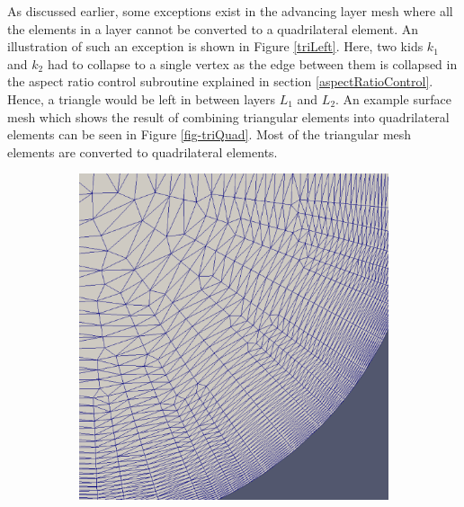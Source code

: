As discussed earlier, some exceptions exist in the advancing layer mesh where all the elements in a layer cannot be converted to a quadrilateral element. An illustration of such an exception is shown in Figure \ref{triLeft}. Here, two kids $k_1$ and $k_2$ had to collapse to a single vertex as the edge between them is collapsed in the aspect ratio control subroutine explained in section \ref{aspectRatioControl}. Hence, a triangle would be left in between layers $L_1$ and $L_2$. An example surface mesh which shows the result of combining triangular elements into quadrilateral elements can be seen in Figure \ref{fig-triQuad}. Most of the triangular mesh elements are converted to quadrilateral elements.

\begin{figure}
\centering
\begin{subfigure}{0.5\textwidth}
\includegraphics[width=0.9\linewidth]{img/m2/combine-tris-to-quads/combineTrisToQuads1.eps}
\caption{}
\label{fig-triQuad1}
\end{subfigure}%
\begin{subfigure}{0.5\textwidth}

\end{subfigure}
\end{figure}
